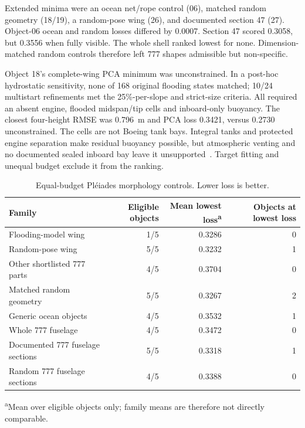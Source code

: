 Extended minima were an ocean net/rope control (06), matched random geometry
(18/19), a random-pose wing (26), and documented section 47 (27). Object-06
ocean and random losses differed by 0.0007. Section 47 scored 0.3058, but
0.3556 when fully visible. The whole shell ranked lowest for none.
Dimension-matched random controls therefore left 777 shapes admissible but
non-specific.

Object 18's complete-wing PCA minimum was unconstrained. In a post-hoc
hydrostatic sensitivity, none of 168 original flooding states matched; 10/24
multistart refinements met the 25\%-per-slope and strict-size criteria. All
required an absent engine, flooded midspan/tip cells and inboard-only buoyancy.
The closest four-height RMSE was 0.796~m and PCA loss 0.3421, versus 0.2730
unconstrained. The cells are not Boeing tank bays. Integral tanks and protected
engine separation make residual buoyancy possible, but atmospheric venting and
no documented sealed inboard bay leave it
unsupported~\citep{aaib2010ba38,motmalaysia2018,ntsb2014fueltank}. Target
fitting and unequal budget exclude it from the ranking.

\begin{table}[t]
  \centering
  \footnotesize
  \caption{Equal-budget Pl\'eiades morphology controls. Lower loss is better.}
  \label{tab:pleiades-morphology-controls}
  \begin{tabular}{lrrr}
    \toprule
    Family & Eligible objects & Mean lowest loss\textsuperscript{a} &
      Objects at lowest loss \\
    \midrule
    Flooding-model wing            & 1/5 & 0.3286 & 0 \\
    Random-pose wing               & 5/5 & 0.3232 & 1 \\
    Other shortlisted 777 parts    & 4/5 & 0.3704 & 0 \\
    Matched random geometry        & 5/5 & 0.3267 & 2 \\
    Generic ocean objects          & 4/5 & 0.3532 & 1 \\
    Whole 777 fuselage               & 4/5 & 0.3472 & 0 \\
    Documented 777 fuselage sections & 5/5 & 0.3318 & 1 \\
    Random 777 fuselage sections     & 4/5 & 0.3388 & 0 \\
    \bottomrule
  \end{tabular}

  \vspace{2pt}
  \parbox{0.94\linewidth}{\footnotesize\textsuperscript{a}Mean over eligible
  objects only; family means are therefore not directly comparable.}
\end{table}

